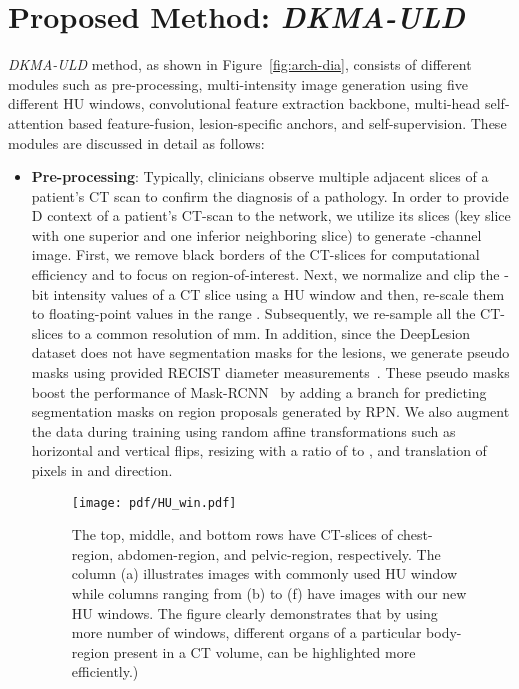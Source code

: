 \documentclass{bmvc2k}
\begin{document}
\section{Proposed Method: \emph{DKMA-ULD}}
\label{sec:proposed-method}
\vspace{-2mm}
\emph{DKMA-ULD} method, as shown in Figure~\ref{fig:arch-dia}, consists of different modules such as pre-processing, multi-intensity image generation using five different HU windows, convolutional feature extraction backbone, multi-head self-attention based feature-fusion, lesion-specific anchors, and self-supervision. These modules are discussed in detail as follows:
\begin{itemize}

\item \textbf{Pre-processing}: Typically, clinicians observe multiple adjacent slices of a patient's CT scan to confirm the diagnosis of a pathology. In order to provide D context of a patient's CT-scan to the network, we utilize its  slices (key slice with one superior and one inferior neighboring slice) to generate -channel image. First, we remove black borders of the CT-slices for computational efficiency and to focus on region-of-interest. Next, we normalize and clip the -bit intensity values of a CT slice using a HU window and then, re-scale them to floating-point values in the range . Subsequently, we re-sample all the CT-slices to a common resolution of  mm.
In addition, since the DeepLesion dataset does not have segmentation masks for the lesions, we generate pseudo masks using provided RECIST diameter measurements~\cite{recist}. These pseudo masks boost the performance of Mask-RCNN~\cite{he2017mask} by adding a branch for predicting segmentation masks on region proposals generated by RPN. We also augment the data during training using random affine transformations such as horizontal and vertical flips, resizing with a ratio of  to , and translation of  pixels in  and  direction. 

\begin{figure}[t]
  \centering
  \texttt{[image: pdf/HU\_win.pdf]}
  \caption{\small{The top, middle, and bottom rows have CT-slices of chest-region, abdomen-region, and pelvic-region, respectively. The column (a) illustrates images with commonly used HU window  while columns ranging from (b) to (f) have images with our new  HU windows. The figure clearly demonstrates that by using more number of windows, different organs of a particular body-region present in a CT volume, can be highlighted more efficiently.)}}
  \label{fig:hu-windows}
  \vspace{-3mm}
\end{figure}


\end{itemize}
\end{document}
